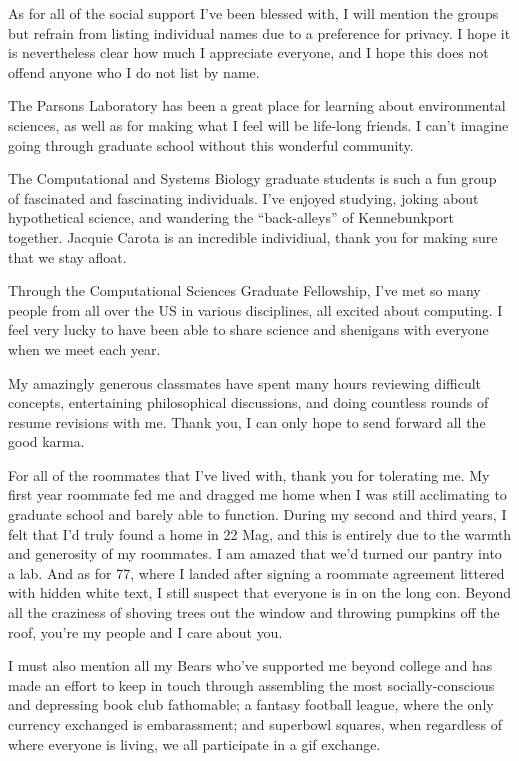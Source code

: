 \documentclass[12pt,twoside]{mitthesis-manusdown}
\begin{document}
As for all of the social support I've been blessed with, I will mention
the groups but refrain from listing individual names due to a preference
for privacy. I hope it is nevertheless clear how much I appreciate
everyone, and I hope this does not offend anyone who I do not list by
name.

The Parsons Laboratory has been a great place for learning about
environmental sciences, as well as for making what I feel will be
life-long friends. I can't imagine going through graduate school without
this wonderful community.

The Computational and Systems Biology graduate students is such a fun
group of fascinated and fascinating individuals. I've enjoyed studying,
joking about hypothetical science, and wandering the ``back-alleys'' of
Kennebunkport together. Jacquie Carota is an incredible individiual,
thank you for making sure that we stay afloat.

Through the Computational Sciences Graduate Fellowship, I've met so many
people from all over the US in various disciplines, all excited about
computing. I feel very lucky to have been able to share science and
shenigans with everyone when we meet each year.

My amazingly generous classmates have spent many hours reviewing
difficult concepts, entertaining philosophical discussions, and doing
countless rounds of resume revisions with me. Thank you, I can only hope
to send forward all the good karma.

For all of the roommates that I've lived with, thank you for tolerating
me. My first year roommate fed me and dragged me home when I was still
acclimating to graduate school and barely able to function. During my
second and third years, I felt that I'd truly found a home in 22 Mag,
and this is entirely due to the warmth and generosity of my roommates. I
am amazed that we'd turned our pantry into a lab. And as for 77, where I
landed after signing a roommate agreement littered with hidden white
text, I still suspect that everyone is in on the long con. Beyond all
the craziness of shoving trees out the window and throwing pumpkins off
the roof, you're my people and I care about you.

I must also mention all my Bears who've supported me beyond college and
has made an effort to keep in touch through assembling the most
socially-conscious and depressing book club fathomable; a fantasy
football league, where the only currency exchanged is embarassment; and
superbowl squares, when regardless of where everyone is living, we all
participate in a gif exchange.
\end{document}

